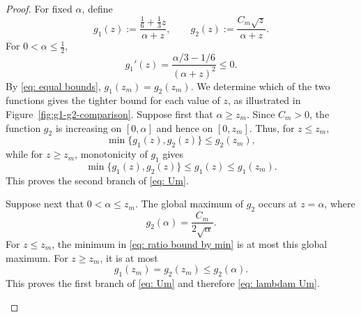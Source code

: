 \documentclass[%
english, titlepage=false %
]{./tum-templates/book/tumbook}
\begin{document}
\begin{proof}
For fixed \(\alpha\), define
\[
 g_1(z):=\frac{\frac16+\frac13z}{\alpha+z},
 \qquad
 g_2(z):=\frac{C_m\sqrt z}{\alpha+z}.
\]
For \(0<\alpha\le \frac12\),
\[
 g_1'(z)=\frac{\alpha/3-1/6}{(\alpha+z)^2}\le0.
\]
By \eqref{eq: equal bounds}, \(g_1(z_m)=g_2(z_m)\).
We determine which of the two functions gives the tighter bound for each
value of $z$, as illustrated in Figure~\ref{fig:g1-g2-comparison}.
Suppose first that \(\alpha\ge z_m\). Since $C_m > 0$, the function \(g_2\) is increasing
on \([0,\alpha]\) and hence on \([0,z_m]\).  Thus, for \(z\le z_m\),
\[
 \min\{g_1(z),g_2(z)\}\le g_2(z_m),
\]
while for \(z\ge z_m\), monotonicity of \(g_1\) gives
\[
 \min\{g_1(z),g_2(z)\}\le g_1(z)\le g_1(z_m).
\]
This proves the second branch of \eqref{eq: Um}.

Suppose next that \(0<\alpha\le z_m\).  The global maximum of \(g_2\) occurs
at \(z=\alpha\), where
\[
 g_2(\alpha)=\frac{C_m}{2\sqrt\alpha}.
\]
For \(z\le z_m\), the minimum in \eqref{eq: ratio bound by min} is at most this global maximum.  For
\(z\ge z_m\), it is at most
\[
 g_1(z_m)=g_2(z_m)\le g_2(\alpha).
\]
This proves the first branch of \eqref{eq: Um} and therefore \eqref{eq: lambdam Um}.

\begin{figure}[ht]
\centering
\begin{minipage}{0.48\textwidth}
\centering
{}
\end{minipage}
\end{figure}
\end{proof}
\end{document}
